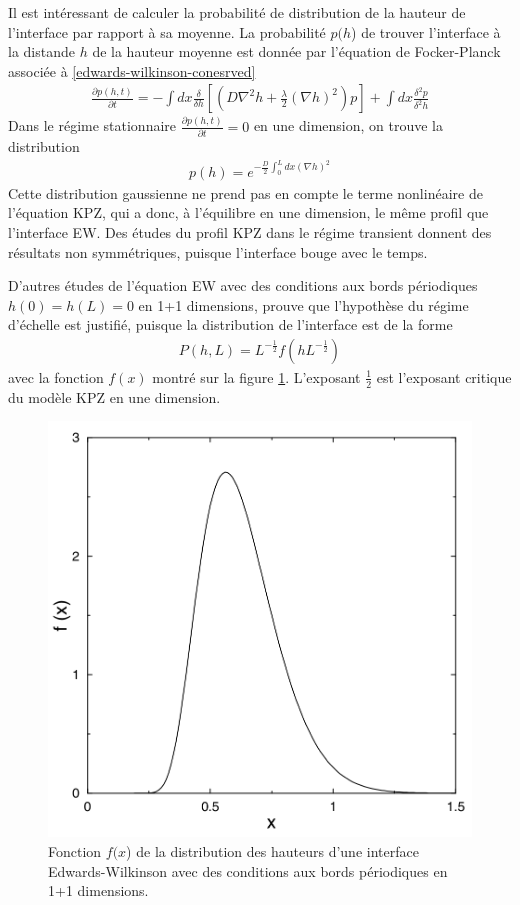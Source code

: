 Il est intéressant de calculer la probabilité de distribution de la hauteur de l'interface par rapport à sa moyenne. La probabilité $p(h$) de trouver l'interface à la distande $h$ de la hauteur moyenne est donnée par l'équation de Focker-Planck\cite[p.241]{halpin-healy_kinetic_1995} associée à \ref{edwards-wilkinson-conesrved}
\begin{align}
    \frac{\partial p(h,t)}{\partial t} = - \int dx \frac{\delta}{\delta h} \left[ \left( D \nabla^2 h + \frac{\lambda}{2} (\nabla h) ^2 \right) p \right] + \int dx \frac{\delta^2 p}{\delta^2 h}
    \label{fokker-planck}
\end{align}
Dans le régime stationnaire $ \frac{\partial p(h,t)}{\partial t} = 0$ en une dimension, on trouve la distribution
\begin{align}
    p(h) = e^{-\frac{D}{2}\int_0^L dx (\nabla h)^2}
    \label{stationary-distribution}
\end{align}
Cette distribution gaussienne ne prend pas en compte le terme nonlinéaire de l'équation KPZ, qui a donc, à l'équilibre en une dimension, le même profil que l'interface EW. Des études du profil KPZ dans le régime transient \cite{miettinen_experimental_2005,assis_dynamic_2015,g_foltin_width_1994,antal_dynamic_1996} donnent des résultats non symmétriques, puisque l'interface bouge avec le temps.

D'autres études de l'équation EW avec des conditions aux bords périodiques $h(0)=h(L)=0$ en 1+1 dimensions, prouve que l'hypothèse du régime d'échelle est justifié\cite{majumdar_airy_2005}, puisque la distribution de l'interface est de la forme 
\begin{align}
    P(h,L) = L^{-\frac{1}{2}} f(h L^{-\frac{1}{2}} )
\end{align}
avec la fonction $f(x)$ montré sur la figure \ref{fig-airy-majumdar}. L'exposant $\frac{1}{2}$ est l'exposant critique du modèle KPZ en une dimension.
\begin{figure}
    \centering
    \includegraphics[width=0.5\linewidth]{intro/airyplot-majumdar.png}
    \caption{Fonction $f(x$) de la distribution des hauteurs d'une interface Edwards-Wilkinson avec des conditions aux bords périodiques\cite{majumdar_airy_2005} en 1+1 dimensions.}
     \label{fig-airy-majumdar}
\end{figure}



